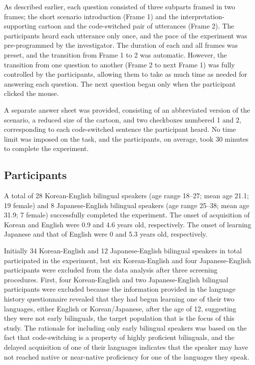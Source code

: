 As described earlier, each question consisted of three subparts framed in two frames; the short scenario introduction (Frame 1) and the interpretation-sup\-por\-ting cartoon and the code-switched pair of utterances (Frame 2). The participants heard each utterance only once, and the pace of the experiment was pre-program\-med by the investigator. The duration of each and all frames was preset, and the transition from Frame 1 to 2 was automatic. However, the transition from one question to another (Frame 2 to next Frame 1) was fully controlled by the participants, allowing them to take as much time as needed for answering each question. The next question began only when the participant clicked the mouse.

A separate answer sheet was provided, consisting of an abbreviated version of the scenario, a reduced size of the cartoon, and two checkboxes numbered 1 and 2, corresponding to each code-switched sentence the participant heard. No time limit was imposed on the task, and the participants, on average, took 30 minutes to complete the experiment.


\subsection{Participants}\label{ch2:sect:2.1.4} 

A total of 28 Korean-English bilingual speakers (age range 18--27; mean age 21.1; 19 female) and 8 Japanese-English bilingual speakers (age range 25--38; mean age 31.9; 7 female) successfully completed the experiment. The onset of acquisition of Korean and  English were 0.9 and 4.6 years old, respectively. The onset of learning Japanese and that of English were 0 and 5.3 years old, respectively.

Initially 34 Korean-English and 12 Japanese-English bilingual speakers in total participated in the experiment, but six Korean-English and four Japanese-English participants were excluded from the data analysis after three screening procedures. First, four Korean-English and two Japanese-English bilingual participants were excluded because the information provided in the language history questionnaire revealed that they had begun learning one of their two languages, either English or Korean/Japanese, after the age of 12, suggesting they were not early bilinguals, the target population that is the focus of this study. The rationale for including only early bilingual speakers was based on the fact that code-switching is a property of highly proficient bilinguals, and the delayed acquisition of one of their languages indicates that the speaker may have not reached native or near-native proficiency for one of the languages they speak. 

